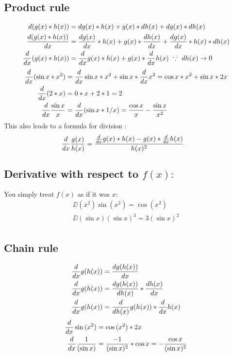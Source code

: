 \documentclass[a4paper,14pt,twoside]{book}
\begin{document}
{\subsection{Product rule}
\begin{align*}
	d(g(x) * h(x))        & = dg(x)*h(x) + g(x)*dh(x) + dg(x)*dh(x)                           \\
	\DD{(g(x) * h(x))}{x} & = \DD{g(x)}{x}*h(x) + g(x)*\DD{h(x)}{x} + \DD{g(x)}{x}*h(x)*dh(x) \\
	\D (g(x) * h(x))      & = \D g(x) * h(x) + g(x) * \D h(x)\ \because\ dh(x) \to 0
\end{align*}
\begin{align*}
	\frac{d}{dx} (\sin{x} * x^2)
	 & = \frac{d}{dx} \sin{x} * x^2 + \sin{x} * \frac{d}{dx} x^2
	= \cos{x} * x^2 + \sin{x} * 2x           \\
	\frac{d}{dx} (2 * x)
	 & = 0 * x + 2 * 1
	= 2                                      \\
	\frac{d}{dx} \frac{\sin{x}}{x}
	 & = \frac{d}{dx} (\sin{x} * 1/x)
	= \frac{\cos{x}}{x} - \frac{\sin{x}}{x^2}
\end{align*}
This also leads to a formula for division $:$
\begin{align*}
	\frac{d}{dx} \frac{g(x)}{h(x)} & = \frac{\frac{d}{dx} g(x) * h(x) - g(x) * \frac{d}{dx} h(x)}{h(x)^2}
\end{align*}
\pagebreak
\subsection{Derivative with respect to $f(x):$} \label{d/df(x)}
You simply treat $f(x)$ as if it was $x:$
\begin{align*}
	\DD{}{(x^2)} \sin{(x^2)}
	= \cos{(x^2)}  \\
	\DD{}{(\sin{x})} (\sin{x})^3
	= 3(\sin{x})^2 \\
\end{align*}
\subsection{Chain rule}
\begin{align*}
	\frac{d}{dx} g(h(x)) & = \frac{d g(h(x))}{d x}                     \\
	\frac{d}{dx} g(h(x)) & = \frac{d g(h(x))}{d h(x)} * \frac{d h(x)}{d x}   \\
	\frac{d}{dx} g(h(x)) & = \frac{d }{d h(x)} g(h(x)) * \frac{d }{d x} h(x) \\
\end{align*}
\begin{align*}
	\frac{d}{dx} \sin{(x^2)}
	 & = \cos{(x^2)} * 2x              \\
	\frac{d}{dx} \frac{1}{(\sin{x})}
	 & = \frac{-1}{(\sin{x})^2} * \cos{x}
	= -\frac{\cos{x}}{(\sin{x})^2}        \\
\end{align*}
\pagebreak
}
\end{document}
